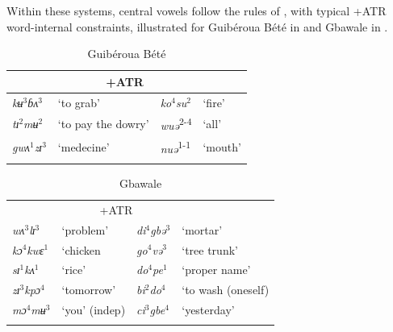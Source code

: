 \documentclass[output=paper,newtxmath,modfonts,nonflat]{langsci/langscibook}
\begin{document}
Within these systems, central vowels follow the rules of , with typical +ATR word-internal constraints, illustrated for Guibéroua Bété in  and Gbawale in .


\begin{table}
\caption{Guibéroua Bété \citep{Werle1976}}
\label{tab:zogbo:8}
\begin{tabular}{llll}
\lsptoprule
\multicolumn{2}{c}{−ATR} & \multicolumn{2}{c}{+ATR}\\
\midrule
\textit{kʉ}$^3$\textit{ɓʌ}$^3$ &  ‘to grab’ &      \textit{ko}$^4$\textit{su}$^2$ &   ‘fire’\\

\textit{tɪ}$^2$\textit{mʉ}$^2$ & ‘to pay the dowry’  &  \textit{wuə}\textsuperscript{2-4} & ‘all’\\

\textit{gwʌ}$^1$\textit{zɪ}$^3$ &  ‘medecine’      & \textit{nuə}\textsuperscript{1-1}  &   ‘mouth’\\
\lspbottomrule
\end{tabular}
\end{table}

\begin{table}
\caption{Gbawale \citep{Seri1987}}
\label{tab:zogbo:9}
\begin{tabular}{llll}
\lsptoprule
\multicolumn{2}{c}{−ATR} & \multicolumn{2}{c}{+ATR}\\

\textit{wʌ}$^3$\textit{lɪ}$^3$  &  ‘problem’  &     \textit{di}$^4$\textit{gbə}$^3$ & ‘mortar’ \\

\textit{kɔ}$^4$\textit{kwɛ}$^1$ & ‘chicken &      \textit{go}$^4$\textit{və}$^3$ &  ‘tree trunk’\\

\textit{sɪ}$^1$\textit{kʌ}$^1$ & ‘rice’  &       \textit{do}$^4$\textit{pe}$^1$ &  ‘proper name’ \\ 

\textit{zɪ}$^3$\textit{kpɔ}$^4$ & ‘tomorrow’   &    \textit{bi}$^2$\textit{do}$^4$ &  ‘to wash (oneself)\\

\textit{mɔ}$^4$\textit{mʉ}$^3$ & ‘you’ (indep)   &   \textit{ci}$^3$\textit{gbe}$^4$ & ‘yesterday’\\
\lspbottomrule
\end{tabular}
\end{table}

\newpage 
\end{document}
